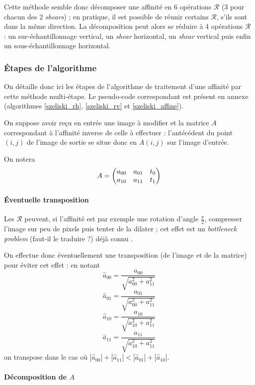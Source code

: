	Cette méthode semble donc décomposer une affinité en 6 opérations $\mathcal R$ (3 pour chacun des 2 \emph{shears}) ; en pratique, il est possible de réunir certains $\mathcal R$, s'ils sont dans la même direction. La décomposition peut alors se réduire à 4 opérations $\mathcal R$ : un sur-échantillonnage vertical, un \emph{shear} horizontal, un \emph{shear} vertical puis enfin un sous-échantillonnage horizontal.
	
\subsubsection{Étapes de l'algorithme}
	On détaille donc ici les étapes de l'algorithme de traitement d'une affinité par cette méthode multi-étape. Le pseudo-code correspondant est présent en annexe (algorithmes \ref{szeliski_rh}, \ref{szeliski_rv} et \ref{szeliski_affine}).
	
	On suppose avoir reçu en entrée une image à modifier et la matrice $A$ correspondant à l'affinité inverse de celle à effectuer : l'antécédent du point $(i,j)$ de l'image de sortie se situe donc en $A(i,j)$ sur l'image d'entrée.
	
	On notera
	\[A = \begin{pmatrix} a_{00} & a_{01} & t_0\\ a_{10} & a_{11} & t_1 \end{pmatrix}\]
	
	\paragraph{Éventuelle transposition}
		
		Les $\mathcal R$ peuvent, si l'affinité est par exemple une rotation d'angle $\frac{\pi}{2}$, compresser l'image sur peu de pixels puis tenter de la dilater ; cet effet est un \emph{bottleneck problem} (faut-il le traduire  ?) déjà connu \cite{wolberg1990digital}.
		
		On effectue donc éventuellement une transposition (de l'image et de la matrice) pour éviter cet effet : en notant
		\[\hat a_{00} = \frac{a_{00}}{\sqrt{a_{00}^2+a_{11}^2}}\]
		\[\hat a_{01} = \frac{a_{01}}{\sqrt{a_{00}^2+a_{11}^2}}\]
		\[\hat a_{10} = \frac{a_{10}}{\sqrt{a_{10}^2+a_{11}^2}}\]
		\[\hat a_{11} = \frac{a_{11}}{\sqrt{a_{10}^2+a_{11}^2}}\]
		on transpose dans le cas où $|\hat a_{00}|+|\hat a_{11}|<|\hat a_{01}|+|\hat a_{10}|$.
		
	\paragraph{Décomposition de $A$}
		
